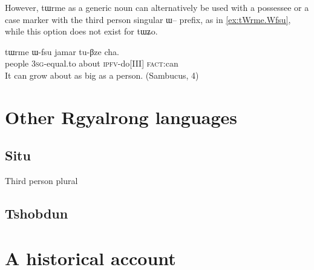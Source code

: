 \documentclass[oldfontcommands,oneside,a4paper,11pt]{article}
\newcommand{\ipa}[1]{{\phon \mbox{#1}}} %
\begin{document}
However, \ipa{tɯrme} as a generic noun can alternatively be used with a possessee or a case marker with the third person singular \ipa{ɯ--} prefix, as in \ref{ex:tWrme.Wfsu}, while this option does not exist for \ipa{tɯʑo}.

\begin{exe}
\ex  \label{ex:tWrme.Wfsu}
\gll
 	\ipa{tɯrme} 	\ipa{ɯ-fsu} 	\ipa{jamar} 	\ipa{tu-βze} 	\ipa{cha.} \\
people \textsc{3sg}-equal.to about \textsc{ipfv}-do[III] \textsc{fact}:can \\
\glt It can grow about as big as a person. (Sambucus, 4)
\end{exe}
 
 

\section{Other Rgyalrong languages}
\subsection{Situ}
\citet{linxr93jiarong}
\citet[163]{lin09phd}

Third person plural

\citet[101-102]{jacques12agreement}
\subsection{Tshobdun}
\citet{sun14generic}
\section{A historical account}




\end{document}
